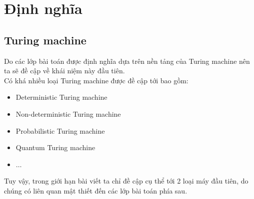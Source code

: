 \documentclass[a4paper 14pt]{article}
\begin{document}
	\section{Định nghĩa}
		\subsection{Turing machine}
			Do các lớp bài toán được định nghĩa dựa trên nền tảng của Turing machine nên ta sẽ đề cập về khái niệm này đầu tiên.\\
			Có khá nhiều loại Turing machine được đề cập tới bao gồm:\\
			\begin{itemize}
				\item Deterministic Turing machine
				\item Non-deterministic Turing machine
				\item Probabilistic Turing machine
				\item Quantum Turing machine
				\item $\hdots$
			\end{itemize}
			Tuy vậy, trong giới hạn bài viết ta chỉ đề cập cụ thể tới 2 loại máy đầu tiên, do chúng có liên quan mật thiết đến các lớp bài toán phía sau.
\end{document}
